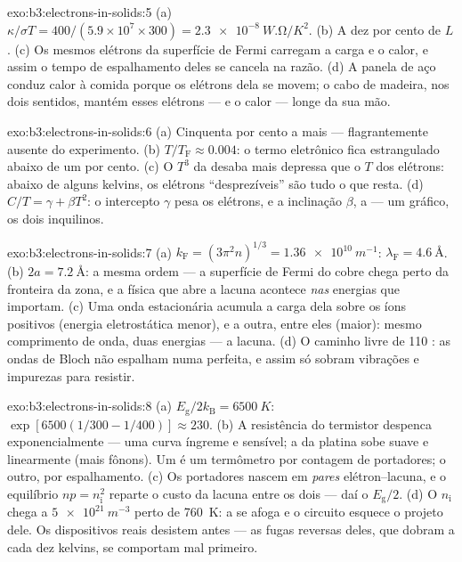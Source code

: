 \begin{solution}{exo:b3:electrons-in-solids:5}
(a) $\kappa/\sigma T = 400/(5.9\times10^7\times300) =
\qty{2.3e-8}{W.\ohm/K^2}$. (b) A dez por cento de $L$. (c)
Os mesmos elétrons da superfície de Fermi carregam a carga e o
calor, e assim o tempo de espalhamento deles se cancela na razão. (d) A
panela de aço conduz calor à comida porque os elétrons dela se movem;
o cabo de madeira,  nos dois sentidos, mantém esses elétrons ---
e o calor --- longe da sua mão.
\end{solution}

\begin{solution}{exo:b3:electrons-in-solids:6}
(a) Cinquenta por cento a mais --- flagrantemente ausente do experimento.
(b) $T/T_{\text{F}} \approx 0.004$: o termo eletrônico fica
estrangulado abaixo de um por cento. (c) O $T^3$ da  desaba
mais depressa que o $T$ dos elétrons: abaixo de alguns kelvins, os
elétrons ``desprezíveis'' são tudo o que resta. (d) $C/T =
\gamma + \beta T^2$: o intercepto $\gamma$ pesa os elétrons,
e a inclinação $\beta$, a  --- um gráfico, os dois inquilinos.
\end{solution}

\begin{solution}{exo:b3:electrons-in-solids:7}
(a) $k_{\text{F}} = (3\pi^2n)^{1/3} = \qty{1.36e10}{m^{-1}}$:
$\lambda_{\text{F}} = \qty{4.6}{\angstrom}$. (b) $2a =
\qty{7.2}{\angstrom}$: a mesma ordem --- a superfície de Fermi do cobre
chega perto da fronteira da zona, e a física que abre a lacuna
acontece \emph{nas} energias que importam. (c) Uma onda estacionária
acumula a carga dela sobre os íons positivos (energia eletrostática
menor), e a outra, entre eles (maior): mesmo comprimento de onda, duas
energias --- a lacuna. (d) O caminho livre de 110 :
as ondas de Bloch não espalham numa  perfeita, e assim só
sobram vibrações e impurezas para resistir.
\end{solution}

\begin{solution}{exo:b3:electrons-in-solids:8}
(a) $E_{\text{g}}/2k_{\text{B}} = \qty{6500}{K}$:
$\exp[6500(1/300 - 1/400)] \approx 230$. (b) A resistência do
termistor despenca exponencialmente --- uma curva íngreme e sensível;
a da platina sobe suave e linearmente (mais fônons). Um é um
termômetro por contagem de portadores; o outro, por espalhamento. (c)
Os portadores nascem em \emph{pares} elétron--lacuna, e o
equilíbrio $np = n_{\text{i}}^2$ reparte o custo da lacuna entre
os dois --- daí o $E_{\text{g}}/2$. (d)
O $n_{\text{i}}$ chega a $\qty{5e21}{m^{-3}}$ perto de \qty{760}{K}:
a  se afoga e o circuito esquece o projeto dele. Os dispositivos
reais desistem antes --- as fugas reversas deles, que dobram a cada
dez kelvins, se comportam mal primeiro.
\end{solution}

